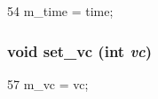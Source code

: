 \begin{DoxyCode}
54 { m_time = time; }
\end{DoxyCode}
\hypertarget{classflit__d_a4ce1a22dd3bca1c2111888b02d8f6baa}{
\subsubsection[{set\_\-vc}]{\setlength{\rightskip}{0pt plus 5cm}void set\_\-vc (int {\em vc})}}
\label{classflit__d_a4ce1a22dd3bca1c2111888b02d8f6baa}



\begin{DoxyCode}
57 { m_vc = vc; }
\end{DoxyCode}


